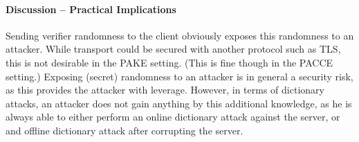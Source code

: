 %
%
%
%
%
%


\paragraph{Discussion -- Practical Implications}
Sending verifier randomness to the client obviously exposes this randomness to an attacker.
While transport could be secured with another protocol such as \ac{TLS}, this is not desirable in the \ac{PAKE} setting.
(This is fine though in the \ac{PACCE} setting.)
Exposing (secret) randomness to an attacker is in general a security risk, as this provides the attacker with leverage.
However, in terms of dictionary attacks, an attacker does not gain anything by this additional knowledge, as he is always able to either perform an online dictionary attack against the server, or and offline dictionary attack after corrupting the server.

